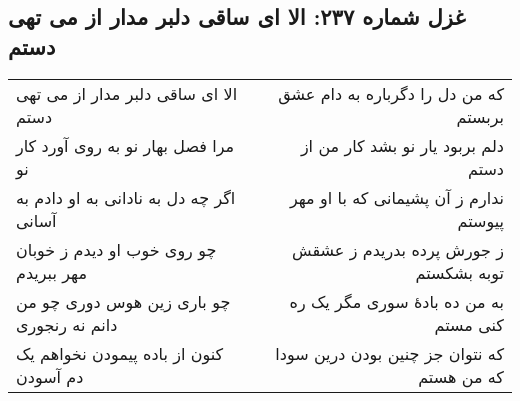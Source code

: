 \begin{center}
\section*{غزل شماره ۲۳۷: الا ای ساقی دلبر مدار از می تهی دستم}
\label{sec:237}
\begin{longtable}{l p{0.5cm} r}
الا ای ساقی دلبر مدار از می تهی دستم
&&
که من دل را دگرباره به دام عشق بربستم
\\
مرا فصل بهار نو به روی آورد کار نو
&&
دلم بربود یار نو بشد کار من از دستم
\\
اگر چه دل به نادانی به او دادم به آسانی
&&
ندارم ز آن پشیمانی که با او مهر پیوستم
\\
چو روی خوب او دیدم ز خوبان مهر ببریدم
&&
ز جورش پرده بدریدم ز عشقش توبه بشکستم
\\
چو باری زین هوس دوری چو من دانم نه رنجوری
&&
به من ده بادهٔ سوری مگر یک ره کنی مستم
\\
کنون از باده پیمودن نخواهم یک دم آسودن
&&
که نتوان جز چنین بودن درین سودا که من هستم
\\
\end{longtable}
\end{center}

